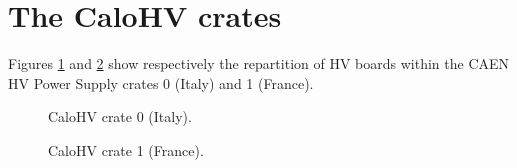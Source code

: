 
\clearpage
\section{The CaloHV crates}

Figures \ref{fig:calohv:crates:1}  and \ref{fig:calohv:crates:2}  show
respectively the repartition of HV boards within the CAEN HV Power Supply
crates 0 (Italy) and 1 (France).

\begin{figure}[h!]
  \begin{center}
    \scalebox{0.6}{}
  \end{center}
  \caption{CaloHV crate 0 (Italy).}
  \label{fig:calohv:crates:1}
\end{figure}

\begin{figure}[h!]
  \begin{center}
    \scalebox{0.6}{}
  \end{center}
  \caption{CaloHV crate 1 (France).}
  \label{fig:calohv:crates:2}
 
\end{figure}

\clearpage

